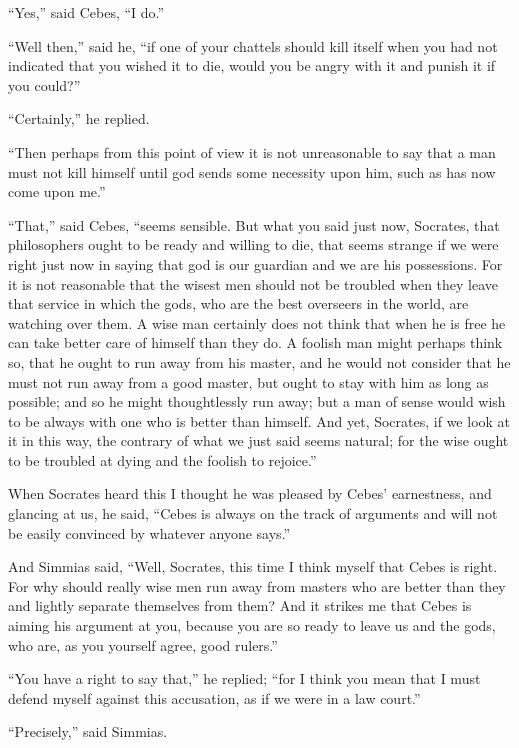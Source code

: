 \documentclass[letterpaper,12pt]{article}
\newcommand{\stephpag}[1]{\marginnote{\small\itshape\fontfamily{ppl}\selectfont #1}}
\begin{document}
\begin{drama}
``Yes,'' said Cebes, \stephpag{c} ``I do.''
 
``Well then,'' said he, ``if one of your chattels should kill itself when you had not indicated that you wished it to die, would you be angry with it and punish it if you could?''
 
``Certainly,'' he replied.
 
``Then perhaps from this point of view it is not unreasonable to say that a man must not kill himself until god sends some necessity upon him, such as has now come upon me.''
 
``That,'' said Cebes, ``seems sensible. But what you said just now, Socrates, that philosophers ought to be ready and willing to die, that seems \stephpag{d} strange if we were right just now in saying that god is our guardian and we are his possessions. For it is not reasonable that the wisest men should not be troubled when they leave that service in which the gods, who are the best overseers in the world, are watching over them. A wise man certainly does not think that when he is free he can take better care of himself than they do. A foolish man might perhaps think so, that he ought to run away from his master, \stephpag{e} and he would not consider that he must not run away from a good master, but ought to stay with him as long as possible; and so he might thoughtlessly run away; but a man of sense would wish to be always with one who is better than himself. And yet, Socrates, if we look at it in this way, the contrary of what we just said seems natural; for the wise ought to be troubled at dying and the foolish to rejoice.''
 
When Socrates heard this \stephpag{63 a} I thought he was pleased by Cebes' earnestness, and glancing at us, he said, ``Cebes is always on the track of arguments and will not be easily convinced by whatever anyone says.''
 
And Simmias said, ``Well, Socrates, this time I think myself that Cebes is right. For why should really wise men run away from masters who are better than they and lightly separate themselves from them? And it strikes me that Cebes is aiming his argument at you, because you are so ready to leave us and the gods, who are, as \stephpag{b} you yourself agree, good rulers.''
 
``You have a right to say that,'' he replied; ``for I think you mean that I must defend myself against this accusation, as if we were in a law court.''
 
``Precisely,'' said Simmias.
 

\end{drama}
\end{document}
